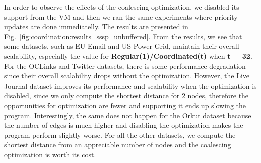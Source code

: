 In order to observe the effects of the coalescing optimization, we disabled its
support from the VM and then we ran the same experiments where priority updates
are done immediatelly. The results are presented in
Fig.~\ref{fig:coordination:results_sssp_unbuffered}. From the results, we see
that some datasets, such as EU Email and US Power Grid, maintain their overall
scalability, especially the value for \textbf{Regular(1)/Coordinated(t)} when
\textbf{t = 32}. For the OCLinks and Twitter datasets, there is some
performance degradation since their overall scalability drops without the
optimization. However, the Live Journal dataset improves its performance and
scalability when the optimization is disabled, since we only compute the
shortest distance for 2 nodes, therefore the opportunities for optimization are
fewer and supporting it ends up slowing the program. Interestingly, the
same does not happen for the Orkut dataset because the number of edges is much
higher and disabling the optimization makes the program perform slightly worse.
For all the other datasets, we compute the shortest distance from an appreciable
number of nodes and the coalescing optimization is worth its cost.



